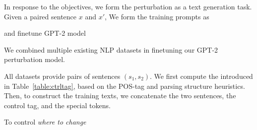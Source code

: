 In response to the objectives, we form the perturbation as a text generation task.
Given a paired sentence $x$ and $x'$, We form the training prompts as 


and finetune GPT-2 model


We combined multiple existing NLP datasets in finetuning our GPT-2 perturbation model. 


All datasets provide pairs of sentences $(s_1, s_2)$.
We first compute the \tagstrs introduced in Table~\ref{table:ctrltag}, based on the POS-tag and parsing structure heuristics.
Then, to construct the training texts, we concatenate the two sentences, the control tag, and the special tokens. 


To control \emph{where to change}